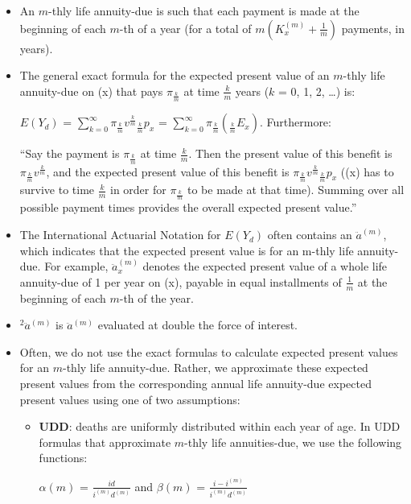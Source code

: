 \documentclass[]{book}
\begin{document}
\begin{itemize}
\item
  An \(m\)-thly life annuity-due is such that each payment is made at
  the beginning of each \(m\)-th of a year (for a total of
  \(m (K^{(m)}_x + \frac{1}{m})\) payments, in years).
\item
  The general exact formula for the expected present value of an
  \(m\)-thly life annuity-due on (x) that pays \(\pi_{\frac{k}{m}}\) at
  time \(\frac{k}{m}\) years (\(k\) = 0, 1, 2, \ldots{}) is:

  \(E(Y_d)\) =
  \(\sum^{\infty}_{k = 0} \pi_{\frac{k}{m}} v^{\frac{k}{m}}{}_{\frac{k}{m}}p_x\)
  = \(\sum^{\infty}_{k = 0} \pi_{\frac{k}{m}} ({}_{\frac{k}{m}}E_x)\).
  Furthermore:

  ``Say the payment is \(\pi_{\frac{k}{m}}\) at time \(\frac{k}{m}\).
  Then the present value of this benefit is
  \(\pi_{\frac{k}{m}} v^{\frac{k}{m}}\), and the expected present value
  of this benefit is
  \(\pi_{\frac{k}{m}} v^{\frac{k}{m}}{}_{\frac{k}{m}}p_x\) ((x) has to
  survive to time \(\frac{k}{m}\) in order for \(\pi_{\frac{k}{m}}\) to
  be made at that time). Summing over all possible payment times
  provides the overall expected present value.''
\item
  The International Actuarial Notation for \(E(Y_d)\) often contains an
  \(\ddot{a}^{(m)}\), which indicates that the expected present value is
  for an m-thly life annuity-due. For example, \(\ddot{a}^{(m)}_x\)
  denotes the expected present value of a whole life annuity-due of 1
  per year on (x), payable in equal installments of \(\frac{1}{m}\) at
  the beginning of each \(m\)-th of the year.
\item
  \(^2\ddot{a}^{(m)}\) is \(\ddot{a}^{(m)}\) evaluated at double the
  force of interest.
\item
  Often, we do not use the exact formulas to calculate expected present
  values for an \(m\)-thly life annuity-due. Rather, we approximate
  these expected present values from the corresponding annual life
  annuity-due expected present values using one of two assumptions:

  \begin{itemize}
  \item
    \textbf{UDD}: deaths are uniformly distributed within each year of
    age. In UDD formulas that approximate \(m\)-thly life annuities-due,
    we use the following functions:

    \(\alpha(m)\) = \(\frac{id}{i^{(m)}d^{(m)}}\) and \(\beta(m)\) =
    \(\frac{i - i^{(m)}}{i^{(m)}d^{(m)}}\)


\end{itemize}
\end{itemize}
\end{document}
